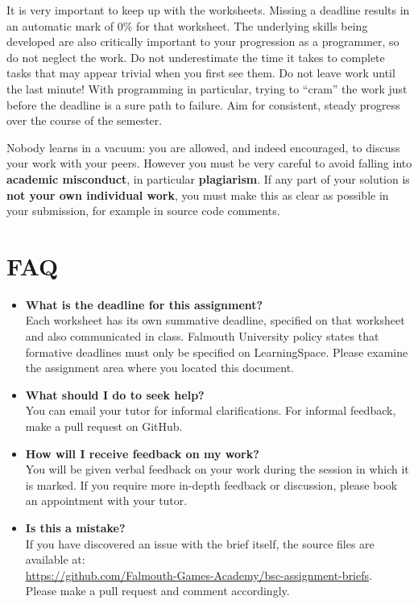\documentclass{../fal_assignment}
\begin{document}
It is very important to keep up with the worksheets. Missing a deadline results in an automatic mark of 0\% for that worksheet.
The underlying skills being developed are also critically important to your progression as a programmer, so do not neglect the work.
Do not underestimate the time it takes to complete tasks that may appear trivial when you first see them.
Do not leave work until the last minute! With programming in particular, trying to ``cram'' the work just before the deadline is a sure path to failure. Aim for consistent, steady progress over the course of the semester.

Nobody learns in a vacuum: you are allowed, and indeed encouraged, to discuss your work with your peers. However you must be very careful to avoid falling into \textbf{academic misconduct}, in particular \textbf{plagiarism}. If any part of your solution is \textbf{not your own individual work}, you must make this as clear as possible in your submission, for example in source code comments.

\section*{FAQ}

\begin{itemize}
	\item 	\textbf{What is the deadline for this assignment?} \\ 
			Each worksheet has its own summative deadline, specified on that worksheet and also communicated in class.
    		Falmouth University policy states that formative deadlines must only be specified on LearningSpace. Please examine the assignment area where you located this document.
    		
	\item 	\textbf{What should I do to seek help?} \\ 
    		You can email your tutor for informal clarifications. For informal feedback, make a pull request on GitHub. 
    		
	\item 	\textbf{How will I receive feedback on my work?} \\ 
    		You will be given verbal feedback on your work during the session in which it is marked.
    		If you require more in-depth feedback or discussion, please book an appointment with your tutor.
    		
    	\item 	\textbf{Is this a mistake?} \\ 	
    		If you have discovered an issue with the brief itself, the source files are available at: \\
    		\url{https://github.com/Falmouth-Games-Academy/bsc-assignment-briefs}.\\
    		 Please make a pull request and comment accordingly.
\end{itemize}
\end{document}
